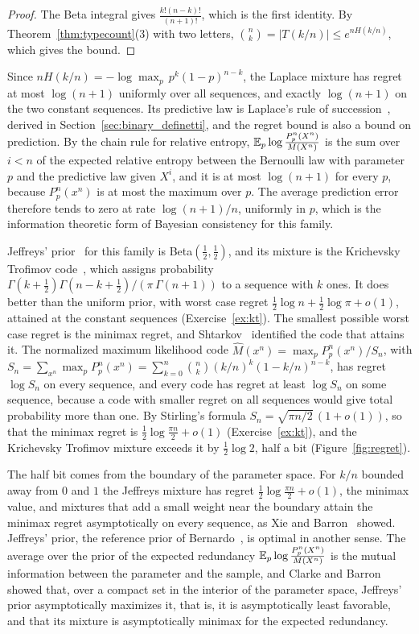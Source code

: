 \begin{proof}
The Beta integral gives $\frac{k!(n-k)!}{(n+1)!}$, which is the first identity. By Theorem~\ref{thm:typecount}(3) with two letters, $\binom nk = |T(k/n)|\leq e^{nH(k/n)}$, which gives the bound.
\end{proof}

Since $nH(k/n) = -\log\max_p\,p^k(1-p)^{n-k}$, the Laplace mixture has regret at most $\log(n+1)$ uniformly over all sequences, and exactly $\log(n+1)$ on the two constant sequences. Its predictive law is Laplace's rule of succession~\cite{laplace1814}, derived in Section~\ref{sec:binary_definetti}, and the regret bound is also a bound on prediction. By the chain rule for relative entropy, $\mathbb{E}_p\log\frac{P_p^n(X^n)}{M(X^n)}$ is the sum over $i<n$ of the expected relative entropy between the Bernoulli law with parameter $p$ and the predictive law given $X^i$, and it is at most $\log(n+1)$ for every $p$, because $P_p^n(x^n)$ is at most the maximum over $p$. The average prediction error therefore tends to zero at rate $\log(n+1)/n$, uniformly in $p$, which is the information theoretic form of Bayesian consistency for this family.

Jeffreys' prior~\cite{jeffreys1946} for this family is Beta$(\frac12,\frac12)$, and its mixture is the Krichevsky Trofimov code~\cite{krichevsky1981}, which assigns probability $\Gamma(k+\frac12)\Gamma(n-k+\frac12)/(\pi\,\Gamma(n+1))$ to a sequence with $k$ ones. It does better than the uniform prior, with worst case regret $\frac12\log n+\frac12\log\pi+o(1)$, attained at the constant sequences (Exercise~\ref{ex:kt}). The smallest possible worst case regret is the minimax regret, and Shtarkov~\cite{shtarkov1987} identified the code that attains it. The normalized maximum likelihood code $\hat M(x^n) = \max_pP_p^n(x^n)/S_n$, with $S_n = \sum_{x^n}\max_pP_p^n(x^n) = \sum_{k=0}^n\binom nk(k/n)^k(1-k/n)^{n-k}$, has regret $\log S_n$ on every sequence, and every code has regret at least $\log S_n$ on some sequence, because a code with smaller regret on all sequences would give total probability more than one. By Stirling's formula $S_n = \sqrt{\pi n/2}\,(1+o(1))$, so that the minimax regret is $\frac12\log\frac{\pi n}{2}+o(1)$ (Exercise~\ref{ex:kt}), and the Krichevsky Trofimov mixture exceeds it by $\frac12\log2$, half a bit (Figure~\ref{fig:regret}).

The half bit comes from the boundary of the parameter space. For $k/n$ bounded away from $0$ and $1$ the Jeffreys mixture has regret $\frac12\log\frac{\pi n}{2}+o(1)$, the minimax value, and mixtures that add a small weight near the boundary attain the minimax regret asymptotically on every sequence, as Xie and Barron~\cite{xiebarron2000} showed. Jeffreys' prior, the reference prior of Bernardo~\cite{bernardo1979}, is optimal in another sense. The average over the prior of the expected redundancy $\mathbb{E}_p\log\frac{P_p^n(X^n)}{M(X^n)}$ is the mutual information between the parameter and the sample, and Clarke and Barron~\cite{clarkebarron1990,clarkebarron1994} showed that, over a compact set in the interior of the parameter space, Jeffreys' prior asymptotically maximizes it, that is, it is asymptotically least favorable, and that its mixture is asymptotically minimax for the expected redundancy.

